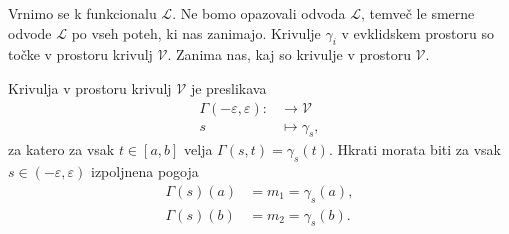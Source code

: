 Vrnimo se k funkcionalu $\mathcal{L}$. Ne bomo opazovali odvoda $\mathcal{L}$, temveč le smerne odvode $\mathcal{L}$ po vseh poteh, ki nas zanimajo. Krivulje $\gamma_i$ v evklidskem prostoru so točke v prostoru krivulj $\mathcal{V}$. Zanima nas,
kaj so krivulje v prostoru $\mathcal{V}$.

\begin{definicija}
\label{def_krivulja_v_prostoru_krivulj}
Krivulja v prostoru krivulj $\mathcal{V}$ je preslikava \begin{align*}
    \Gamma  (-\varepsilon, \varepsilon): &\longrightarrow \mathcal{V} \\
    s &\longmapsto \gamma_s,
\end{align*}
za katero za vsak $t \in  [a,b]$ velja $\Gamma(s,t) = \gamma_s(t)$. Hkrati morata biti za vsak $s \in (-\varepsilon, \varepsilon)$ izpoljnena pogoja \begin{align*}
    \Gamma(s)(a) &= m_1 = \gamma_s(a), \\
    \Gamma(s)(b) &= m_2 = \gamma_s(b).
\end{align*}
\end{definicija}
